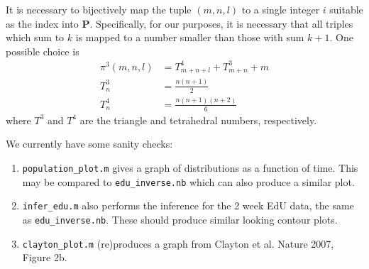 \documentclass[10pt,english]{article}
\begin{document}
It is necessary to bijectively map the tuple $(m,n,l)$ to a single integer $i$ suitable as the index into $\mathbf P$. Specifically, for our purposes, it is necessary that all triples which sum to $k$ is mapped to a number smaller than those with sum $k+1$. One possible choice is \begin{align*}
\pi^3(m,n,l) &= T^4_{m+n+l} + T^3_{m+n} + m \\
T^3_n &= \frac{n(n+1)}{2} \\
T^4_n &= \frac{n(n+1)(n+2)}{6}
\end{align*}
where $T^3$ and $T^4$ are the triangle and tetrahedral numbers, respectively.

We currently have some sanity checks:
\begin{enumerate}
\item {\tt population\_plot.m} gives a graph of distributions as a function of time. This may be compared to {\tt edu\_inverse.nb} which can also produce a similar plot.

\item {\tt infer\_edu.m} also performs the inference for the 2 week EdU data, the same as {\tt edu\_inverse.nb}. These should produce similar looking contour plots.

\item {\tt clayton\_plot.m} (re)produces a graph from Clayton et al. Nature 2007, Figure 2b.
\end{enumerate}
\end{document}
